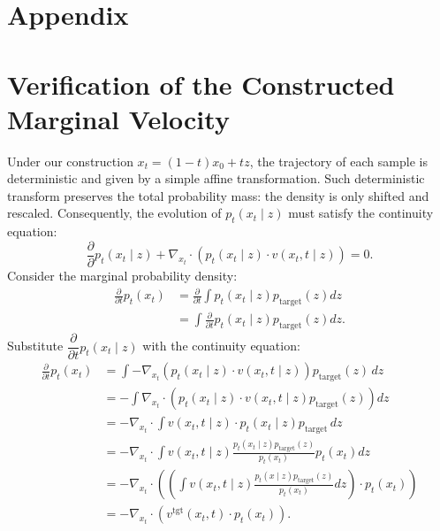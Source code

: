 \section*{Appendix}
\section{Verification of the Constructed Marginal Velocity}\label{app:continuity}

Under our construction $x_t = (1-t) x_0 + t z$, the trajectory of each sample is deterministic and given by a simple affine transformation. Such deterministic transform preserves the total probability mass: the density is only shifted and rescaled. Consequently, the evolution of $p_t(x_t \mid z)$ must satisfy the continuity equation:
%
\begin{equation*}
\frac{\partial}{\partial} p_t(x_t \mid z) + \nabla_{x_t} \cdot (p_t(x_t \mid z) \cdot v(x_t, t \mid z)) = 0.
\end{equation*}
%
Consider the marginal probability density:
%
\begin{align*}
\frac{\partial}{\partial t} p_t(x_t) &= \frac{\partial}{\partial t} \int p_t(x_t \mid z) p_\text{target}(z) dz \\
&= \int  \frac{\partial}{\partial t} p_t(x_t \mid z) p_\text{target} (z) dz.
\end{align*}
%
Substitute $\dfrac{\partial}{\partial t} p_t(x_t \mid z)$ with the continuity equation:
%
\begin{align*}
\frac{\partial}{\partial t} p_t(x_t)
&= \int - \nabla_{x_t} \left( p_t(x_t \mid z) \cdot v(x_t, t \mid z) \right) p_\text{target} (z) \, dz \\
&= - \int \nabla_{x_t} \cdot \left( p_t(x_t \mid z) \cdot v(x_t, t \mid z) p_\text{target}(z) \right) dz \\
&= - \nabla_{x_t} \cdot \int v(x_t, t \mid z) \cdot p_t(x_t \mid z) p_\text{target} \, dz \\
&= - \nabla_{x_t} \cdot \int v(x_t, t \mid z) \frac{p_t(x_t \mid z) p_\text{target}(z)}{p_t (x_t)} p_t(x_t) dz \\
&= - \nabla_{x_t} \cdot \left( \left( \int v(x_t, t \mid z) \frac{p_t(x \mid z) p_\text{target}(z)}{p_t (x_t)} dz \right) \cdot p_t(x_t) \right) \\
&= - \nabla_{x_t} \cdot \left( v^\text{tgt}(x_t, t) \cdot p_t(x_t) \right).
\end{align*}

